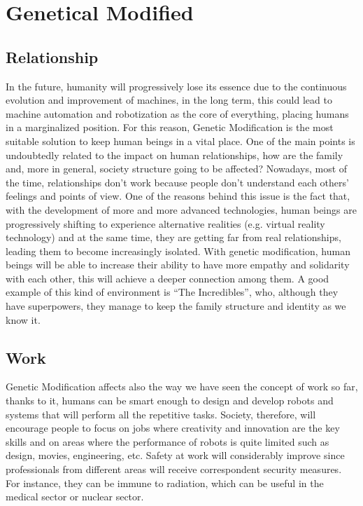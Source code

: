 \chapter*{Genetical Modified}
\label{cha:gm}

\section*{Relationship}
\label{sec:gm_relationship}
In the future, humanity will progressively lose its essence due to the continuous evolution and improvement of machines, in the long term, this could lead to machine automation and robotization as the core of everything, placing humans in a marginalized position. For this reason, Genetic Modification is the most suitable solution to keep human beings in a vital place. One of the main points is undoubtedly related to the impact on human relationships, how are the family and, more in general, society structure going to be affected? Nowadays, most of the time, relationships don’t work because people don’t understand each others’ feelings and points of view. One of the reasons behind this issue is the fact that, with the development of more and more advanced technologies, human beings are progressively shifting to experience alternative realities (e.g. virtual reality technology) and at the same time, they are getting far from real relationships, leading them to become increasingly isolated. With genetic modification, human beings will be able to increase their ability to have more empathy and solidarity with each other, this will achieve a deeper connection among them. A good example of this kind of environment is “The Incredibles”, who, although they have superpowers, they manage to keep the family structure and identity as we know it.

\section*{Work}
\label{sec:work}
Genetic Modification affects also the way we have seen the concept of work so far, thanks to it, humans can be smart enough to design and develop robots and systems that will perform all the repetitive tasks. Society, therefore, will encourage people to focus on jobs where creativity and innovation are the key skills and on areas where the performance of robots is quite limited such as design, movies, engineering, etc. Safety at work will considerably improve since professionals from different areas will receive correspondent security measures. For instance, they can be immune to radiation, which can be useful in the medical sector or nuclear sector. 

